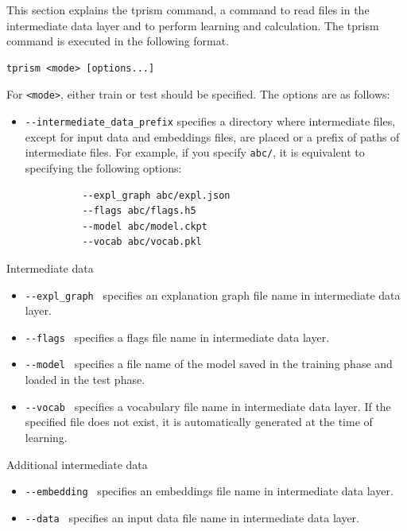 \documentclass[a4paper]{report}
\begin{document}
This section explains the tprism command, a command to read files in the intermediate data layer and to perform learning and calculation.
The tprism command is executed in the following format.
\begin{verbatim}
tprism <mode> [options...]
\end{verbatim}
For \verb|<mode>|, either train or test should be specified.
The options are as follows:
\begin{itemize}
	\item \verb|--intermediate_data_prefix|
specifies a directory where intermediate files, except for input data and embeddings files, are placed or a prefix of paths of intermediate files.
	For example, if you specify {\tt abc/}, it is equivalent to specifying the following options:
	\begin{verbatim}
		  --expl_graph abc/expl.json
		  --flags abc/flags.h5
		  --model abc/model.ckpt
		  --vocab abc/vocab.pkl
	\end{verbatim}
\end{itemize}

Intermediate  data
\begin{itemize}
	\item \verb|--expl_graph | specifies an explanation graph file name in intermediate data layer.	
	\item \verb|--flags | specifies a flags file name in intermediate data layer.	
	\item \verb|--model | specifies a file name of the model saved in the training phase and loaded in the test phase.
	\item \verb|--vocab | specifies a vocabulary file name in intermediate data layer.
	If the specified file does not exist, it is automatically generated at the time of learning.
\end{itemize}

Additional intermediate data
\begin{itemize}
	\item \verb|--embedding | specifies an embeddings file name in intermediate data layer.
	\item \verb|--data | specifies an input data file name in intermediate data layer.	
\end{itemize}
\end{document}
